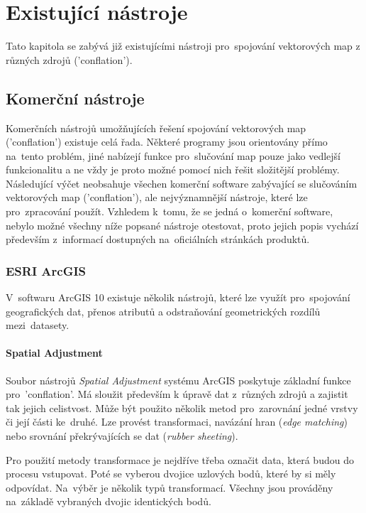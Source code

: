 \chapter{Existující nástroje}
\label{3-nastroje}

Tato kapitola se zabývá již existujícími nástroji pro~spojování vektorových map z různých zdrojů ('conflation').

\section{Komerční nástroje}

Komerčních nástrojů umožňujících řešení spojování vektorových map ('conflation') existuje celá řada. Některé programy jsou orientovány přímo na~tento problém,
jiné nabízejí funkce pro~slučování map pouze jako vedlejší funkcionalitu a ne vždy je proto možné pomocí nich řešit složitější problémy. Následující výčet neobsahuje
všechen komerční software zabývající se slučováním vektorových map ('conflation'), ale nejvýznamnější nástroje, které lze pro~zpracování použít. Vzhledem k~tomu,
že se jedná o~komerční software, nebylo možné všechny níže popsané nástroje otestovat, proto jejich popis vychází především z~informací dostupných na~oficiálních stránkách
produktů.


\subsection{ESRI ArcGIS}

V~softwaru ArcGIS 10 existuje několik nástrojů, které lze využít pro~spojování geografických dat, přenos atributů a odstraňování geometrických rozdílů mezi~datasety. 

\subsubsection{Spatial Adjustment}

Soubor nástrojů \textit{Spatial Adjustment} systému ArcGIS poskytuje základní funkce pro~'conflation'. Má sloužit především k úpravě dat z~různých zdrojů a zajistit tak
jejich celistvost. Může být použito několik metod pro~zarovnání jedné vrstvy či její části ke~druhé. Lze provést transformaci, navázání hran (\textit{edge matching}) nebo
srovnání překrývajících se dat (\textit{rubber sheeting}).

Pro použití metody transformace je nejdříve třeba označit data, která budou do procesu vstupovat. Poté se vyberou dvojice uzlových bodů, které by si měly odpovídat.
Na~výběr je několik typů transformací. Všechny jsou prováděny na~základě vybraných dvojic identických bodů. %

